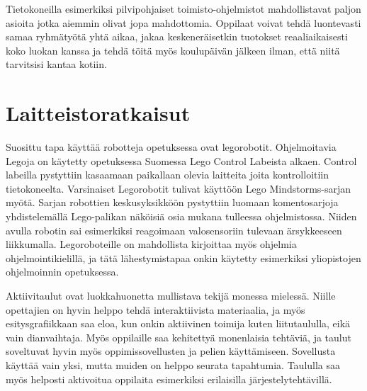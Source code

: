 \documentclass[utf8,bachelor]{gradu3}
\begin{document}
Tietokoneilla esimerkiksi pilvipohjaiset toimisto-ohjelmistot mahdollistavat paljon asioita jotka aiemmin olivat jopa mahdottomia. Oppilaat voivat tehdä luontevasti samaa ryhmätyötä yhtä aikaa, jakaa keskeneräisetkin tuotokset reaaliaikaisesti koko luokan kanssa ja tehdä töitä myös koulupäivän jälkeen ilman, että niitä tarvitsisi kantaa kotiin.


\section{Laitteistoratkaisut}
Suosittu tapa käyttää robotteja opetuksessa ovat legorobotit. Ohjelmoitavia Legoja on käytetty opetuksessa Suomessa  Lego Control Labeista alkaen. \parencite[][]{skrolliRobot} Control labeilla pystyttiin kasaamaan paikallaan olevia laitteita joita kontrolloitiin tietokoneelta. Varsinaiset Legorobotit tulivat käyttöön Lego Mindstorms-sarjan myötä. Sarjan robottien keskusyksikköön pystyttiin luomaan komentosarjoja yhdistelemällä Lego-palikan näköisiä osia mukana tulleessa ohjelmistossa. Niiden avulla robotin sai esimerkiksi reagoimaan valosensoriin tulevaan ärsykkeeseen liikkumalla. Legoroboteille on mahdollista kirjoittaa myös ohjelmia ohjelmointikielillä, ja tätä lähestymistapaa onkin käytetty esimerkiksi yliopistojen ohjelmoinnin opetuksessa. \parencite[][]{korppirobo} \parencite[][]{hesarobo}

Aktiivitaulut ovat luokkahuonetta mullistava tekijä monessa mielessä. Niille opettajien on hyvin helppo tehdä interaktiivista materiaalia, ja myös esitysgrafiikkaan saa eloa, kun onkin aktiivinen toimija kuten liitutaululla, eikä vain dianvaihtaja. Myös oppilaille saa kehitettyä monenlaisia tehtäviä, ja taulut soveltuvat hyvin myös oppimissovellusten ja pelien käyttämiseen. Sovellusta käyttää vain yksi, mutta muiden on helppo seurata tapahtumia. Taululla saa myös helposti aktivoitua oppilaita esimerkiksi erilaisilla järjestelytehtävillä.
\end{document}
